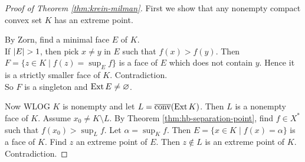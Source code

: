 \documentclass{article}
\begin{document}
\begin{proof}[Proof of Theorem \ref{thm:krein-milman}]
  First we show that any nonempty compact convex set $K$ has an extreme point.

  By Zorn, find a minimal face $E$ of $K$. \\
  If $\left\lvert E\right\rvert > 1$, then pick $x \ne y$ in $E$ such that $f(x) > f(y)$. Then $F = \{z \in K \mid f(z) = \sup_E f\}$ is a face of $E$ which does not contain $y$. Hence it is a strictly smaller face of $K$. Contradiction. \\
  So $F$ is a singleton and $\operatorname{Ext} E \ne \varnothing$.
  
  Now WLOG $K$ is nonempty and let $L = \overline{\operatorname{conv}}(\operatorname{Ext} K)$. Then $L$ is a nonempty face of $K$. Assume $x_0 \ne K \setminus L$. By Theorem \ref{thm:hb-separation-point}, find $f \in X^*$ such that $f(x_0) > \sup_L f$. Let $\alpha = \sup_K f$. Then $E = \{x \in K \mid f(x) = \alpha\}$ is a face of $K$. Find $z$ an extreme point of $E$. Then $z \nin L$ is an extreme point of $K$. Contradiction.
\end{proof}

\newlec

\printindex
\end{document}
